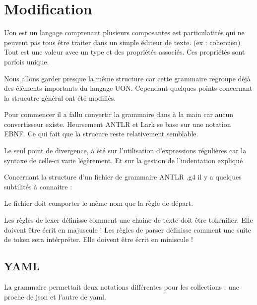 \documentclass[
    iict, %
    il, %
]{heig-tb}
\begin{document}
\section{Modification}
Uon est un langage comprenant plusieurs composantes est particulatités qui ne peuvent pas tous être traiter dans un simple éditeur de texte. (ex : cohercien)
Tout est une valeur avec un type et des propriétés associés. Ces propriétés sont parfois unique.
%

Nous allons garder presque la même structure car cette grammaire regroupe déjà des éléments importants du langage UON.
Cependant quelques points concernant la strucutre général ont été modifiés.

Pour commencer il a fallu convertir la grammaire dans à la main car aucun convertisseur existe. Heursement ANTLR et Lark se base sur une notation EBNF.
Ce qui fait que la strucure reste relativement semblable.

Le seul point de divergence, à été sur l'utilisation d'expressions régulières car la syntaxe de celle-ci varie légèrement. Et sur la gestion de l'indentation expliqué %

Concernant la structure d'un fichier de grammaire ANTLR .g4 il y a quelques subtilités à connaitre :

Le fichier doit comporter le même nom que la règle de départ. %

Les règles de lexer définisse comment une chaine de texte doit être tokenifier. Elle doivent être écrit en majuscule !
Les règles de parser définisse comment une suite de token sera intérpréter. Elle doivent être écrit en miniscule !







\subsection{YAML}
La grammaire permettait deux notations différentes pour les collections : une proche de json et l'autre de yaml.
\end{document}
